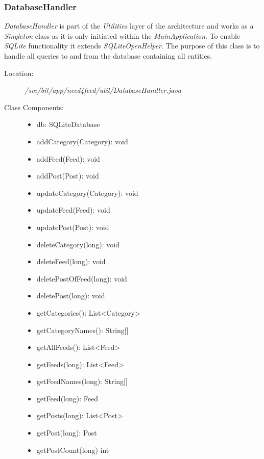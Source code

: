 \subsubsection{DatabaseHandler}
\textit{DatabaseHandler} is part of the \textit{Utilities} layer of the architecture and works as a \textit{Singleton} class as it is only initiated within the \textit{MainApplication}. To enable \textit{SQLite} functionality it extends \textit{SQLiteOpenHelper}. The purpose of this class is to handle all queries to and from the database containing all entities. 
\begin{description}
  \item[Location:] \textit{/src/bit/app/need4feed/util/DatabaseHandler.java} \hfill
  \item[Class Components:] \hfill
     \begin{itemize}
        \item db: SQLiteDatabase
		\item addCategory(Category): void 
		\item addFeed(Feed): void
		\item addPost(Post): void
		\item updateCategory(Category): void
		\item updateFeed(Feed): void
		\item updatePost(Post): void
		\item deleteCategory(long): void
		\item deleteFeed(long): void
		\item deletePostOfFeed(long): void
		\item deletePost(long): void
		\item getCategories(): List\textless Category\textgreater
		\item getCategoryNames(): String[]
		\item getAllFeeds(): List\textless Feed\textgreater
		\item getFeeds(long): List\textless Feed\textgreater
		\item getFeedNames(long): String[]
		\item getFeed(long): Feed
		\item getPosts(long): List\textless Post\textgreater
		\item getPost(long): Post
		\item getPostCount(long) int
     \end{itemize}
\end{description}


